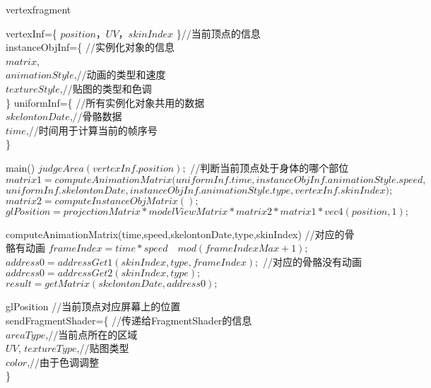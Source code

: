 \documentclass[11pt]{ctexart}
\begin{document}
  
	\begin{algorithm}  
		\caption{vertexfragment}  
		\begin{algorithmic} %
			
			\Require 	
			\State
			vertexInf=\{ $position$，$UV$，$skinIndex$   \}//当前顶点的信息 \\
			instanceObjInf=\{  //实例化对象的信息\\
				\qquad $matrix$,\\
				\qquad $animationStyle$,//动画的类型和速度\\
				\qquad $textureStyle$,//贴图的类型和色调\\
			\}
			\State
			uniformInf=\{  //所有实例化对象共用的数据\\
			\qquad $skelontonDate$,//骨骼数据\\
			\qquad $time$,//时间用于计算当前的帧序号\\
			\}
			
			 \State   
			
			  \Function {}{} main() 
			  \State $judgeArea(vertexInf.position);$ //判断当前顶点处于身体的哪个部位
			  \State  $matrix1=computeAnimationMatrix(uniformInf.time,instanceObjInf.animationStyle.speed,$
\\\qquad\qquad\qquad\qquad $uniformInf.skelontonDate,instanceObjInf.animationStyle.type,vertexInf.skinIndex);$ 
			  \State  $matrix2=computeInstanceObjMatrix();$
			  \State  $glPosition = projectionMatrix* modelViewMatrix*matrix2*matrix1*vec4(position, 1);$
			  \EndFunction 
			

			  \Function {}{}  computeAnimationMatrix(time,speed,skelontonDate,type,skinIndex)
				  //对应的骨骼有动画
				\State $frameIndex=time*speed \quad mod (frameIndexMax+1);$
				\State $address0=addressGet1(skinIndex,type,frameIndex);$
				\Else  //对应的骨骼没有动画
				 \State $address0=addressGet2(skinIndex,type);$
				\EndIf   
				\State$result=getMatrix(skelontonDate,address0);$
				\State {} 
			 \EndFunction 
			
			
			
			
			
			\Ensure
			\State
			glPosition //当前顶点对应屏幕上的位置 \\
			sendFragmentShader=\{  //传递给FragmentShader的信息\\
			\qquad $areaType$,//当前点所在的区域\\
			\qquad $UV$,
			\qquad $textureType$,//贴图类型\\
			\qquad $color$,//由于色调调整\\
			\}
			
		\end{algorithmic}  
	\end{algorithm}  
\end{document}
